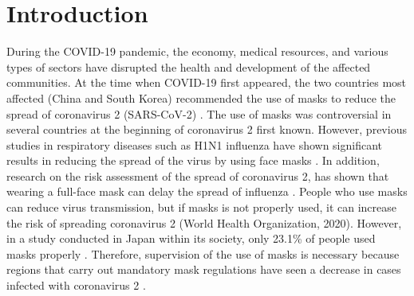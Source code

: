 \documentclass{article}
\begin{document}
\section{Introduction}
During the COVID-19 pandemic, the economy, medical resources, and various types of sectors have disrupted the health and development of the affected communities. At the time when COVID-19 first appeared, the two countries most affected (China and South Korea) recommended the use of masks to reduce the spread of coronavirus 2 (SARS-CoV-2) \citep{Feng2020}.
The use of masks was controversial in several countries at the beginning of coronavirus 2 first known. However, previous studies in respiratory diseases such as H1N1 influenza have shown significant results in reducing the spread of the virus by using face masks \citep{Cowling2010}. In addition, research on the risk assessment of the spread of coronavirus 2, has shown that wearing a full-face mask can delay the spread of influenza \citep{Brienen2010}.
People who use masks can reduce virus transmission, but if masks is not properly used, it can increase the risk of spreading coronavirus 2 (World Health Organization, 2020). However, in a study conducted in Japan within its society, only 23.1\% of people used masks properly \citep{Machida2020}. Therefore, supervision of the use of masks is necessary because regions that carry out mandatory mask regulations have seen a decrease in cases infected with coronavirus 2 \citep{VanDyke2020}.
\end{document}
